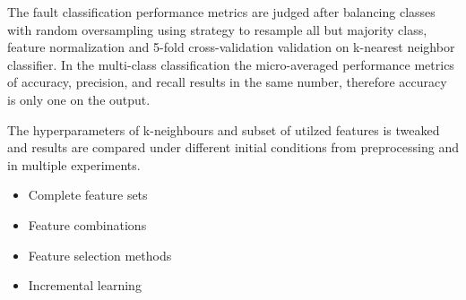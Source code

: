 The fault classification performance metrics are judged after balancing classes with random oversampling using strategy to resample all but majority class, feature normalization and 5-fold cross-validation validation on k-nearest neighbor classifier. In the multi-class classification the micro-averaged performance metrics of accuracy, precision, and recall results in the same number, therefore accuracy is only one on the output. 

The hyperparameters of k-neighbours and subset of utilzed features is tweaked and results are compared under different initial conditions from preprocessing and in multiple experiments.

\begin{itemize}
\item Complete feature sets
\item Feature combinations
\item Feature selection methods
\item Incremental learning
\end{itemize}


